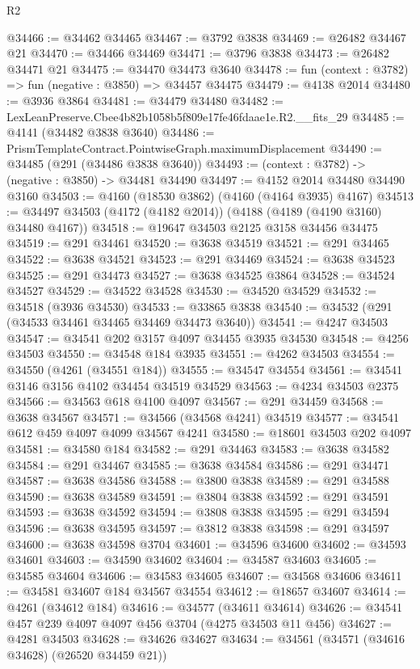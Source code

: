 \begin{lexlean}{R2}
\begin{coremodule}
@34466 := @34462 @34465
@34467 := @3792 @3838
@34469 := @26482 @34467 @21
@34470 := @34466 @34469
@34471 := @3796 @3838
@34473 := @26482 @34471 @21
@34475 := @34470 @34473 @3640
@34478 := fun (context : @3782) => fun (negative : @3850) => @34457 @34475
@34479 := @4138 @2014
@34480 := @3936 @3864
@34481 := @34479 @34480
@34482 := LexLeanPreserve.Cbee4b82b1058b5f809e17fe46fdaae1e.R2.__fits_29
@34485 := @4141 (@34482 @3838 @3640)
@34486 := PrismTemplateContract.PointwiseGraph.maximumDisplacement
@34490 := @34485 (@291 (@34486 @3838 @3640))
@34493 := (context : @3782) -> (negative : @3850) -> @34481 @34490
@34497 := @4152 @2014 @34480 @34490 @3160
@34503 := @4160 (@18530 @3862) (@4160 (@4164 @3935) @4167)
@34513 := @34497 @34503 (@4172 (@4182 @2014)) (@4188 (@4189 (@4190 @3160) @34480 @4167))
@34518 := @19647 @34503 @2125 @3158 @34456 @34475
@34519 := @291 @34461
@34520 := @3638 @34519
@34521 := @291 @34465
@34522 := @3638 @34521
@34523 := @291 @34469
@34524 := @3638 @34523
@34525 := @291 @34473
@34527 := @3638 @34525 @3864
@34528 := @34524 @34527
@34529 := @34522 @34528
@34530 := @34520 @34529
@34532 := @34518 (@3936 @34530)
@34533 := @33865 @3838
@34540 := @34532 (@291 (@34533 @34461 @34465 @34469 @34473 @3640))
@34541 := @4247 @34503
@34547 := @34541 @202 @3157 @4097 @34455 @3935 @34530
@34548 := @4256 @34503
@34550 := @34548 @184 @3935
@34551 := @4262 @34503
@34554 := @34550 (@4261 (@34551 @184))
@34555 := @34547 @34554
@34561 := @34541 @3146 @3156 @4102 @34454 @34519 @34529
@34563 := @4234 @34503 @2375
@34566 := @34563 @618 @4100 @4097
@34567 := @291 @34459
@34568 := @3638 @34567
@34571 := @34566 (@34568 @4241) @34519
@34577 := @34541 @612 @459 @4097 @4099 @34567 @4241
@34580 := @18601 @34503 @202 @4097
@34581 := @34580 @184
@34582 := @291 @34463
@34583 := @3638 @34582
@34584 := @291 @34467
@34585 := @3638 @34584
@34586 := @291 @34471
@34587 := @3638 @34586
@34588 := @3800 @3838
@34589 := @291 @34588
@34590 := @3638 @34589
@34591 := @3804 @3838
@34592 := @291 @34591
@34593 := @3638 @34592
@34594 := @3808 @3838
@34595 := @291 @34594
@34596 := @3638 @34595
@34597 := @3812 @3838
@34598 := @291 @34597
@34600 := @3638 @34598 @3704
@34601 := @34596 @34600
@34602 := @34593 @34601
@34603 := @34590 @34602
@34604 := @34587 @34603
@34605 := @34585 @34604
@34606 := @34583 @34605
@34607 := @34568 @34606
@34611 := @34581 @34607 @184 @34567 @34554
@34612 := @18657 @34607
@34614 := @4261 (@34612 @184)
@34616 := @34577 (@34611 @34614)
@34626 := @34541 @457 @239 @4097 @4097 @456 @3704 (@4275 @34503 @11 @456)
@34627 := @4281 @34503
@34628 := @34626 @34627
@34634 := @34561 (@34571 (@34616 @34628) (@26520 @34459 @21))

\end{coremodule}
\end{lexlean}
